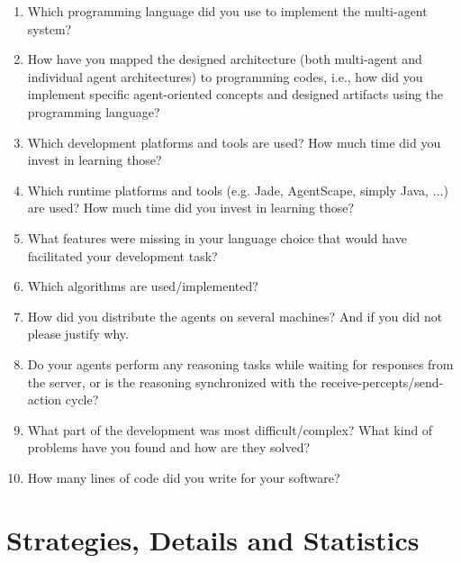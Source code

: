 \documentclass{llncs}
\begin{document}
\begin{enumerate}
\item Which programming language did you use to implement the
  multi-agent system?
\item How have you mapped the designed architecture (both multi-agent
  and individual agent architectures) to programming codes, i.e., how
  did you implement specific agent-oriented concepts and designed
  artifacts using the programming language?
\item Which development platforms and tools are used? How much time did you invest in learning those?
\item Which runtime platforms and tools (e.g. Jade, AgentScape, simply Java, $\ldots$) are used? How much time did you invest in learning those?
 \item What features were missing in your language choice that would have facilitated your development task?
\item Which algorithms are used/implemented?
\item How did you distribute the agents on several machines? And if you did not
please justify why.
\item Do your agents perform any reasoning tasks while waiting for responses from the server, or is the reasoning synchronized with the receive-percepts/send-action cycle?
\item What part of the development was most difficult/complex? What
  kind of problems have you found and how are they solved?
\item How many lines of code did you write for your software?
\end{enumerate}

\section{Strategies, Details and Statistics}\label{sec:strategies}
\end{document}
